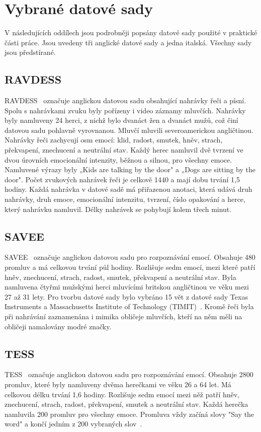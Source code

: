 \documentclass[FM,BP]{tulthesis}
\begin{document}
\section{Vybrané datové sady} %
V následujících oddílech jsou podrobněji popsány datové sady použité v praktické části práce. Jsou uvedeny tři anglické datové sady a jedna italská. Všechny sady jsou předstírané.

\subsection{RAVDESS} \label{desc/ravdess} %
RAVDESS~\cite{ravdess} označuje anglickou datovou sadu obsahující nahrávky řeči a písní. Spolu s nahrávkami zvuku byly pořízeny i video záznamy mluvčích. Nahrávky byly namluveny 24 herci, z nichž bylo dvanáct žen a dvanáct mužů, což činí datovou sadu pohlavně vyrovnanou. Mluvčí mluvili severoamerickou angličtinou. Nahrávky řeči zachycují osm emocí: klid, radost, smutek, hněv, strach, překvapení, znechucení a neutrální stav. Každý herec namluvil dvě tvrzení ve dvou úrovních emocionální intenzity, běžnou a silnou, pro všechny emoce. Namluvené výrazy byly „Kids are talking by the door" a „Dogs are sitting by the door". Počet zvukových nahrávek řeči je celkově 1440 a mají dobu trvání 1,5 hodiny. Každá nahrávka v datové sadě má přiřazenou anotaci, která udává druh nahrávky, druh emoce, emocionální intenzitu, tvrzení, číslo opakování a herce, který nahrávku namluvil. Délky nahrávek se pohybují kolem třech minut.

\subsection{SAVEE} \label{desc/savee} %
SAVEE~\cite{savee} označuje anglickou datovou sadu pro rozpoznávání emocí. Obsahuje 480 promluv a má celkovou trvání půl hodiny. Rozlišuje sedm emocí, mezi které patří hněv, znechucení, strach, radost, smutek, překvapení a neutrální stav. Byla namluvena čtyřmi mužskými herci mluvícími britskou angličtinou ve věku mezi 27 až 31 lety. Pro tvorbu datové sady bylo vybráno 15 vět z datové sady Texas Instruments a Massachusetts Institute of Technology \mbox{(TIMIT)~\cite{timit}}. Kromě řeči byla při nahrávání zaznamenána i mimika obličeje mluvčích, kteří na něm měli na obličeji namalovány modré značky.

\subsection{TESS} \label{desc/tess} %
TESS~\cite{SP2/E8H2MF_2020} označuje anglickou datovou sadu pro rozpoznávání emocí. Obsahuje 2800 promluv, které byly namluveny dvěma herečkami ve věku 26 a 64 let. Má celkovou délku trvání 1,6 hodiny. Rozlišuje sedm emocí mezi něž patří hněv, znechucení, strach, radost, překvapení, smutek a neutrální stav. Každá herečka namluvila 200 promluv pro všechny emoce. Promluva vždy začíná slovy "Say the word" a končí jedním z 200 vybraných slov~\cite{tess}.
\end{document}
